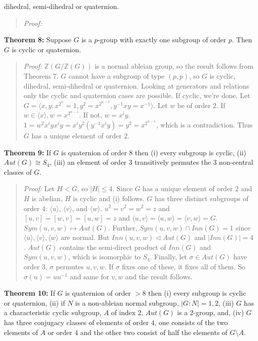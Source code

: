 dihedral, semi-dihedral or quaternion.
\begin{quote}
\emph{Proof:}
\end{quote}
{\bf Theorem 8:} Suppose $G$ is a $p$-group with exactly one subgroup of order $p$. Then $G$ is cyclic or quaternion.
\begin{quote}
\emph{Proof:} ${\mathbb Z}(G/{\mathbb Z}(G))$ is a normal ableian group, so the result follows from Theorem 7.
$G$ cannot have a subgroup of type $(p,p)$, so $G$ is cyclic, dihedral, semi-dihedral or quaternion.
Looking at generators and relations only the cyclic and quaternion cases are possible.  If cyclic, we're done.
Let $G = \langle x,y: x^{2^n} =1, y^2 = x^{2^{n-1}}, y^{-1}xy = x^{-1} \rangle$.  Let $w$ be of order $2$.
If $w \in \langle x \rangle, w = x^{2^{n-1}}$.  If not, $w= x^iy$.
$1 = w^2 x^i y x^i y = x^i y^2 (y^{-1}x^i y)= y^2 = x^{2^{n-1}}$, which is a contradiction.  Thus $G$ has a
unique element of order $2$.
\end{quote}
{\bf Theorem 9:} If $G$ is quaternion of order $8$ then (i) every subgroup is cyclic, (ii) $Aut(G) \cong S_4$,
(iii) an element of order $3$ transitively permutes the $3$ non-central classes of $G$.
\begin{quote}
\emph{Proof:}
Let $H < G$, so $|H| \leq 4$.  Since $G$ has a unique element of order $2$ and $H$ is abelian, $H$ is cyclic and
(i) follows.  $G$ has three distinct subgroups of order $4$:
$\langle u \rangle$,
$\langle v \rangle$, and
$\langle w \rangle$. $u^2=v^2=w^2 =z$ and $[u,v] = [w,v] = [u,w] =z$ and
$\langle u, v \rangle = 
\langle u, w \rangle = 
\langle v, w \rangle = G$.  $Sym(u,v,w) \mapsto Aut(G)$.  Further, $Sym(u,v,w) \cap Inn(G) = 1$ since
$\langle u \rangle, \langle v \rangle, \langle w \rangle$ are normal.  But $Inn(u,v,w) \lhd Aut(G)$ and
$|Inn(G)| = 4$.  $Aut(G)$ contains the semi-direct product of $Inn(G)$ and $Sym(u, v, w)$, which is
isomorphic to $S_4$.  Finally, let  $\sigma \in Aut(G)$ have order $3$, $\sigma$ permutes $u,v,w$.
If $\sigma$ fixes one of these, it fixes all of them.  So $\sigma(u)= u u^{-1}$ and same for $v, w$
and the result follows.
\end{quote}
{\bf Theorem 10:} If $G$ is quaternion of order $>8$ then (i) every subgroup is cyclic or quaternion,
(ii) if $N$ is a non-ableian normal subgroup, $|G:N| = 1, 2$,
(iii) $G$ has a characteristic cyclic subgroup, $A$ of index $2$,
$Aut(G)$ is a $2$-group, and,
(iv) $G$ has three conjugacy classes of elements of order $4$, one consists of the two elements of $A$ or order $4$
and the other two consist of half the elements of $G \setminus A$.
